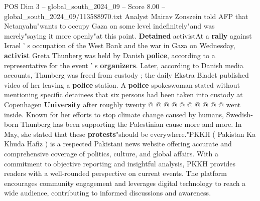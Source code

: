 \begin{textsample}{POS Dim 3 – global\_south\_2024\_09 – Score 8.00 – global\_south\_2024\_09/113588970.txt}
Analyst Mairav Zonszein told AFP that Netanyahu"wants to occupy Gaza on some level indefinitely"and was merely"saying it more openly"at this point. \textbf{Detained} activistAt a \textbf{rally} against Israel ' s occupation of the West Bank and the war in Gaza on Wednesday, \textbf{activist} Greta Thunberg was held by Danish \textbf{police}, according to a representative for the event ' s \textbf{organizers}.
Later, according to Danish media accounts, Thunberg was freed from custody ; the daily Ekstra Bladet published video of her leaving a \textbf{police} station.
A \textbf{police} spokeswoman stated without mentioning specific detainees that six persons had been taken into custody at Copenhagen \textbf{University} after roughly twenty @ @ @ @ @ @ @ @ @ @ went inside.
Known for her efforts to stop climate change caused by humans, Swedish-born Thunberg has been supporting the Palestinian cause more and more.
In May, she stated that these \textbf{protests}"should be everywhere."PKKH ( Pakistan Ka Khuda Hafiz ) is a respected Pakistani news website offering accurate and comprehensive coverage of politics, culture, and global affairs.
With a commitment to objective reporting and insightful analysis, PKKH provides readers with a well-rounded perspective on current events.
The platform encourages community engagement and leverages digital technology to reach a wide audience, contributing to informed discussions and awareness.

\end{textsample}
